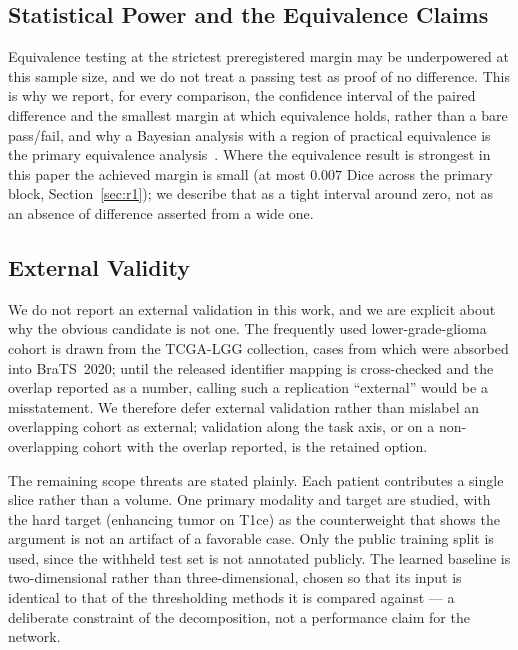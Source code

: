 \subsection{Statistical Power and the Equivalence Claims}

Equivalence testing at the strictest preregistered margin may be underpowered at
this sample size, and we do not treat a passing test as proof of no difference.
This is why we report, for every comparison, the confidence interval of the
paired difference and the smallest margin at which equivalence holds, rather than
a bare pass/fail, and why a Bayesian analysis with a region of practical
equivalence is the primary equivalence analysis~\cite{benavoli_bayes}. Where the
equivalence result is strongest in this paper the achieved margin is small (at
most $0.007$ Dice across the primary block, Section~\ref{sec:r1}); we describe
that as a tight interval around zero, not as an absence of difference asserted
from a wide one.

\subsection{External Validity}

We do not report an external validation in this work, and we are explicit about
why the obvious candidate is not one. The frequently used lower-grade-glioma
cohort is drawn from the TCGA-LGG collection, cases from which were absorbed into
BraTS~2020; until the released identifier mapping is cross-checked and the overlap
reported as a number, calling such a replication ``external'' would be a
misstatement. We therefore defer external validation rather than mislabel an
overlapping cohort as external; validation along the task axis, or on a
non-overlapping cohort with the overlap reported, is the retained option.

The remaining scope threats are stated plainly. Each patient contributes a single
slice rather than a volume. One primary modality and target are studied, with the
hard target (enhancing tumor on T1ce) as the counterweight that shows the
argument is not an artifact of a favorable case. Only the public training split
is used, since the withheld test set is not annotated publicly. The learned
baseline is two-dimensional rather than three-dimensional, chosen so that its
input is identical to that of the thresholding methods it is compared against ---
a deliberate constraint of the decomposition, not a performance claim for the
network.

